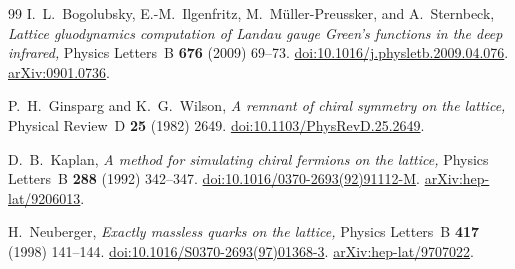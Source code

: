 \documentclass[12pt]{article}
\numberwithin{equation}{section}
\theoremstyle{plain}
\theoremstyle{definition}
\theoremstyle{remark}
\begin{document}
\begin{thebibliography}{99}
			I.~L.\ Bogolubsky, E.-M.\ Ilgenfritz, M.\ M\"{u}ller-Preussker,
			and A.\ Sternbeck,
			\emph{Lattice gluodynamics computation of Landau gauge Green's
				functions in the deep infrared,}
			Physics Letters~B \textbf{676} (2009) 69--73.
			\href{https://doi.org/10.1016/j.physletb.2009.04.076}%
			{doi:10.1016/j.physletb.2009.04.076}.
			\href{https://arxiv.org/abs/0901.0736}{arXiv:0901.0736}.

			P.~H.\ Ginsparg and K.~G.\ Wilson,
			\emph{A remnant of chiral symmetry on the lattice,}
			Physical Review~D \textbf{25} (1982) 2649.
			\href{https://doi.org/10.1103/PhysRevD.25.2649}%
			{doi:10.1103/PhysRevD.25.2649}.

			D.~B.\ Kaplan,
			\emph{A method for simulating chiral fermions on the lattice,}
			Physics Letters~B \textbf{288} (1992) 342--347.
			\href{https://doi.org/10.1016/0370-2693(92)91112-M}%
			{doi:10.1016/0370-2693(92)91112-M}.
			\href{https://arxiv.org/abs/hep-lat/9206013}{arXiv:hep-lat/9206013}.

			H.\ Neuberger,
			\emph{Exactly massless quarks on the lattice,}
			Physics Letters~B \textbf{417} (1998) 141--144.
			\href{https://doi.org/10.1016/S0370-2693(97)01368-3}%
			{doi:10.1016/S0370-2693(97)01368-3}.
			\href{https://arxiv.org/abs/hep-lat/9707022}{arXiv:hep-lat/9707022}.
			
		\end{thebibliography}
		
	
\end{document}
